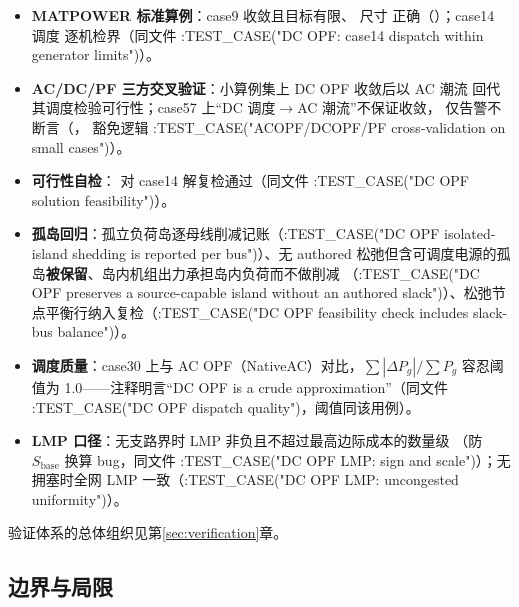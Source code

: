 \begin{itemize}
  \item \textbf{MATPOWER 标准算例}：case9 收敛且目标有限、 尺寸
        正确（）；case14 调度
        逐机检界（同文件 :TEST\_CASE("DC OPF: case14 dispatch within generator limits")）。
  \item \textbf{AC/DC/PF 三方交叉验证}：小算例集上 DC OPF 收敛后以 AC 潮流
        回代其调度检验可行性；case57 上“DC 调度$\to$AC 潮流”不保证收敛，
        仅告警不断言（，
        豁免逻辑 :TEST\_CASE("ACOPF/DCOPF/PF cross-validation on small cases")）。
  \item \textbf{可行性自检}： 对 case14
        解复检通过（同文件 :TEST\_CASE("DC OPF solution feasibility")）。
  \item \textbf{孤岛回归}：孤立负荷岛逐母线削减记账（:TEST\_CASE("DC OPF isolated-island shedding is reported per bus")）、无 authored
        松弛但含可调度电源的孤岛\textbf{被保留}、岛内机组出力承担岛内负荷而不做削减
        （:TEST\_CASE("DC OPF preserves a source-capable island without an authored slack")）、松弛节点平衡行纳入复检（:TEST\_CASE("DC OPF feasibility check includes slack-bus balance")）。
  \item \textbf{调度质量}：case30 上与 AC OPF（NativeAC）对比，$\sum|\Delta
        P_g|/\sum P_g$ 容忍阈值为 1.0——注释明言“DC OPF is a crude
        approximation”（同文件 :TEST\_CASE("DC OPF dispatch quality")，阈值同该用例）。
  \item \textbf{LMP 口径}：无支路界时 LMP 非负且不超过最高边际成本的数量级
        （防 $S_{\mathrm{base}}$ 换算 bug，同文件 :TEST\_CASE("DC OPF LMP: sign and scale")）；无拥塞时全网
        LMP 一致（:TEST\_CASE("DC OPF LMP: uncongested uniformity")）。
\end{itemize}
验证体系的总体组织见第\ref{sec:verification}章。

\subsection{边界与局限}

